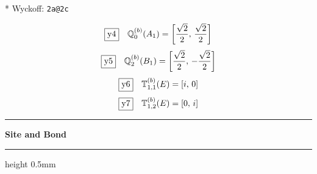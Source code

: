 \documentclass[fleqn,10pt,landscape]{jsarticle}
\begin{document}
\noindent ** Wyckoff: \texttt{2a@2c}

\begin{dmath*}
\fbox{y4}\quad \mathbb{Q}_{0}^{(b)}(A_{1})=\left[ \frac{\sqrt{2}}{2},\, \frac{\sqrt{2}}{2} \right]
\end{dmath*}
\begin{dmath*}
\fbox{y5}\quad \mathbb{Q}_{2}^{(b)}(B_{1})=\left[ \frac{\sqrt{2}}{2},\, - \frac{\sqrt{2}}{2} \right]
\end{dmath*}
\begin{dmath*}
\fbox{y6}\quad \mathbb{T}_{1,1}^{(b)}(E)=\left[ i,\, 0 \right]
\end{dmath*}
\begin{dmath*}
\fbox{y7}\quad \mathbb{T}_{1,2}^{(b)}(E)=\left[ 0,\, i \right]
\end{dmath*}
\vspace{5mm}
\noindent \rule[0.5mm]{5mm}{0.5mm}\hspace{3mm}\textbf{Site and Bond}\hspace{3mm}\leaders\hrule height 0.5mm\hfill\kern0pt
\vspace{3mm}
\end{document}
